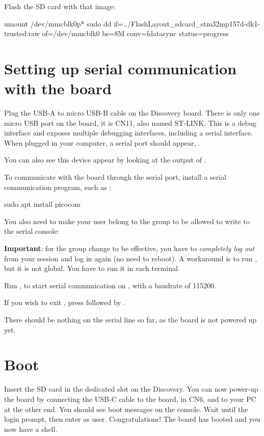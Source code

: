 Flash the SD card with that image:
\begin{bashinput}
umount /dev/mmcblk0p*
sudo dd if=../FlashLayout_sdcard_stm32mp157d-dk1-trusted.raw of=/dev/mmcblk0 bs=8M conv=fdatasync status=progress
\end{bashinput}

\section{Setting up serial communication with the board}

Plug the USB-A to micro USB-B cable on the Discovery board. There is
only one micro USB port on the board, it is CN11, also named ST-LINK.
This is a debug interface and exposes multiple debugging interfaces,
including a serial interface. When plugged in your computer, a serial
port should appear, .

You can also see this device appear by looking at the output of
.

To communicate with the board through the serial port, install a
serial communication program, such as :

\begin{bashinput}
sudo apt install picocom
\end{bashinput}

You also need to make your user belong to the  group to be
allowed to write to the serial console:


{\bf Important}: for the group change to be effective, you have to
{\em completely log out} from your session and log in again (no need to
reboot). A workaround is to run , but it is not global.
You have to run it in each terminal.

Run , to start serial
communication on , with a baudrate of 115200.

If you wish to exit , press \code{[Ctrl][a]} followed by
\code{[Ctrl][x]}.

There should be nothing on the serial line so far, as the board is not
powered up yet.

\section{Boot}

Insert the SD card in the dedicated slot on the Discovery.  You can
now power-up the board by connecting the USB-C cable to the board, in
CN6,  and to your PC at the other end.  You should see
boot messages on the console. Wait until the login prompt, then enter
 as user.  Congratulations! The board has booted and you
now have a shell.


